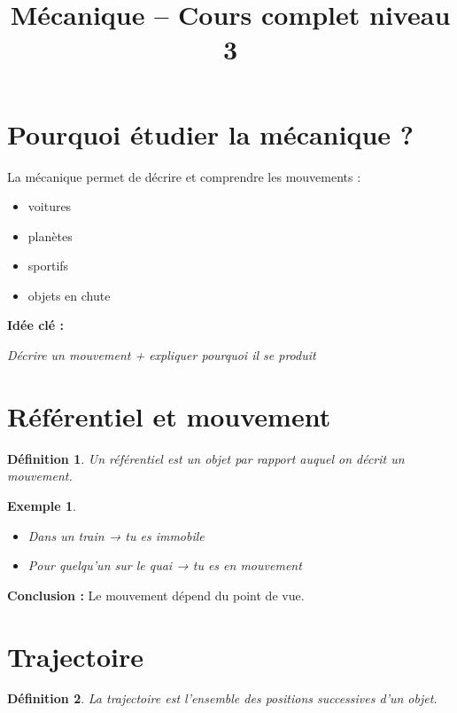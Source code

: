 \documentclass[11pt,a4paper]{article}
\title{\Huge Mécanique – Cours complet niveau 3\ieme}
\date{}
\newtheorem{definition}{Définition}
\newtheorem{example}{Exemple}
\begin{document}
\maketitle

\section{Pourquoi étudier la mécanique ?}

La mécanique permet de décrire et comprendre les mouvements :
\begin{itemize}
\item voitures
\item planètes
\item sportifs
\item objets en chute
\end{itemize}

\textbf{Idée clé :}  
\begin{center}
\textit{Décrire un mouvement + expliquer pourquoi il se produit}
\end{center}

\section{Référentiel et mouvement}

\begin{definition}
Un référentiel est un objet par rapport auquel on décrit un mouvement.
\end{definition}

\begin{example}
\begin{itemize}
\item Dans un train → tu es immobile
\item Pour quelqu’un sur le quai → tu es en mouvement
\end{itemize}
\end{example}

\textbf{Conclusion :}  
Le mouvement dépend du point de vue.

\section{Trajectoire}

\begin{definition}
La trajectoire est l’ensemble des positions successives d’un objet.
\end{definition}
\end{document}
